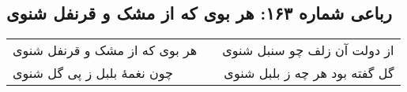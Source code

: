 \begin{center}
\section*{رباعی شماره ۱۶۳: هر بوی که از مشک و قرنفل شنوی}
\label{sec:163}
\begin{longtable}{l p{0.5cm} r}
هر بوی که از مشک و قرنفل شنوی
&&
از دولت آن زلف چو سنبل شنوی
\\
چون نغمهٔ بلبل ز پی گل شنوی
&&
گل گفته بود هر چه ز بلبل شنوی
\\
\end{longtable}
\end{center}
